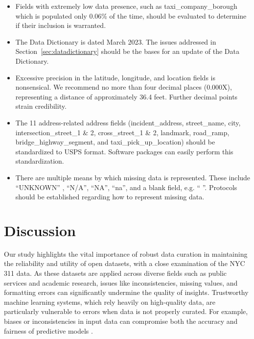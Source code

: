 \documentclass[linenumber]{jdsart}
\begin{document}
\begin{itemize}
	\item Fields with extremely low data presence, such as taxi\_company\_borough 
	which is populated only 0.06\% of the time, should be evaluated 
	to determine if their inclusion is warranted.
	
	\item The Data Dictionary is dated March 2023. The issues addressed 
	in Section~\ref{sec:datadictionary} should be the bases for an update of
	the Data Dictionary.
	
	\item Excessive precision in the latitude, longitude, and location 
	fields is nonsensical.  We recommend no more than 
	four decimal places (0.000X), representing a distance of approximately 
	36.4 feet. Further decimal points strain credibility.

	\item The 11 address-related address fields (incident\_address, 
	street\_name, city, intersection\_street\_1 \& 2, cross\_street\_1 \& 2,  
	landmark, road\_ramp, bridge\_highway\_segment, and 
	taxi\_pick\_up\_location) should be standardized to USPS format. 
	Software packages can easily perform this standardization. 
	
	\item There are multiple means by which missing data is 
	represented. These include ``UNKNOWN'' , ``N/A'', ``NA'', ``na'', and 
	a blank field, e.g. `` ''. Protocols should be established regarding 
	how to represent missing data.
\end{itemize}


\section{Discussion} \label{sec:discussion}

Our study highlights the vital importance of robust data curation in
maintaining the reliability and utility of open datasets, with a close
examination of the NYC 311 data. As these datasets are applied across
diverse fields such as public services and academic research, issues
like inconsistencies, missing values, and formatting errors can
significantly undermine the quality of insights. Trustworthy machine
learning systems, which rely heavily on high-quality data, are
particularly vulnerable to errors when data is not properly
curated. For example, biases or inconsistencies in input data can
compromise both the accuracy and fairness of predictive models
\citep{rahm2000data}.
\end{document}
